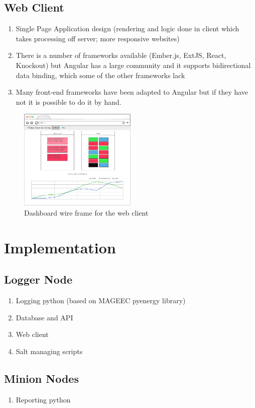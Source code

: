 \documentclass{l4proj}
\begin{document}
\section{Web Client}
\begin{enumerate}
	\item Single Page Application design (rendering and logic done in client which takes processing off server; more responsive websites)
	\item There is a number of frameworks available (Ember.js, ExtJS, React, Knockout) but Angular has a large community and it supports bidirectional data binding, which some of the other frameworks lack
	\item Many front-end frameworks have been adapted to Angular but if they have not it is possible to do it by hand.
\end{enumerate}
\begin{figure}[!ht]
  \caption{Dashboard wire frame for the web client}
  \centering
    \includegraphics[width=0.5\textwidth]{figures/v2_dashboard}
\end{figure}

\chapter{Implementation}
\section{Logger Node}
\begin{enumerate}
	\item Logging python (based on MAGEEC pyenergy library)
	\item Database and API
	\item Web client
	\item Salt managing scripts
\end{enumerate}
\section{Minion Nodes}
\begin{enumerate}
	\item Reporting python
\end{enumerate}
\end{document}
